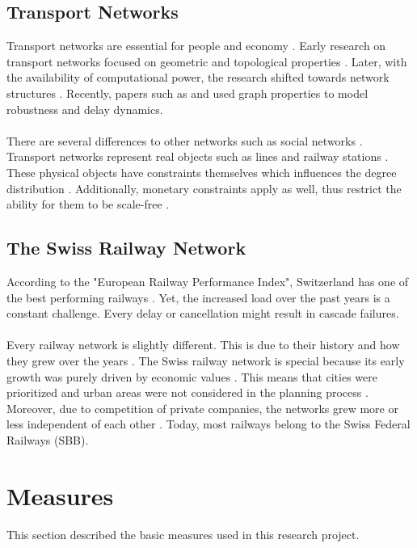 \documentclass{Resources/netsci-project}
\begin{document}
\subsection{Transport Networks}
Transport networks are essential for people and economy \autocite{GraphSwiss} . Early research on transport networks focused on geometric and topological properties \autocite{GraphSwiss} . Later, with the availability of computational power, the research shifted towards network structures \autocite{GraphSwiss}. Recently, papers such as \textcite{Resilience} and \textcite{ComplexDelay} used graph properties to model robustness and delay dynamics.
\\~\\
There are several differences to other networks such as social networks \autocite{GraphSwiss}. Transport networks represent real objects such as lines and railway stations \autocite{GraphSwiss}. These physical objects have constraints themselves which influences the degree distribution \autocite{GraphSwiss}. Additionally, monetary constraints apply as well, thus restrict the ability for them to be scale-free \autocite{GraphSwiss}.

\subsection{The Swiss Railway Network}
According to the "European Railway Performance Index", Switzerland has one of the best performing railways  \autocite{RailwayPerformanceIndex}. Yet, the increased load over the past years is a constant challenge. Every delay or cancellation might result in cascade failures.
\\~\\
Every railway network is slightly different. This is due to their history and how they grew over the years \autocite{GraphSwiss}. The Swiss railway network is special because its early growth was purely driven by economic values \autocite{GraphSwiss}. This means that cities were prioritized and urban areas were not considered in the planning process \autocite{GraphSwiss}. Moreover, due to competition of private companies, the networks grew more or less independent of each other \autocite{GraphSwiss}. Today, most railways belong to the Swiss Federal Railways (SBB).

\section{Measures}
This section described the basic measures used in this research project.
\end{document}
